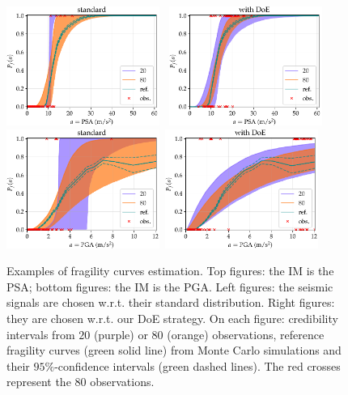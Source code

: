     \begin{figure}[h]
        \centering%
        \includegraphics[width=5cm]{figures/DoE/ex_est_frag_PSA_standard_80.pdf}\ %
        \includegraphics[width=5cm]{figures/DoE/ex_est_frag_PSA_PE_80.pdf}\\[5pt]
        \includegraphics[width=5cm]{figures/DoE/ex_est_frag_PGA_standard_80.pdf}\ \includegraphics[width=5cm]{figures/DoE/ex_est_frag_PGA_PE_80.pdf}%
        \caption{Examples of fragility curves estimation. Top figures: the IM is the PSA; bottom figures: the IM is the PGA. Left figures: the seismic signals are chosen w.r.t. their standard distribution. Right figures: they are chosen w.r.t. our DoE strategy.
        On each figure: credibility intervals from $20$ (purple) or $80$ (orange) observations, reference fragility curves (green solid line) from Monte Carlo simulations and their {$95\%$}-confidence intervals (green dashed lines). The red crosses represent the $80$ observations.}
        \label{fig:doe:ex-estfrag}
    \end{figure}







